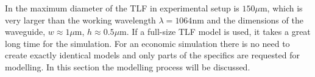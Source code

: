 In \cite{nanoscal_tapered_fiber} the maximum diameter of the TLF in experimental setup is $150\mu$m, which is very larger than the working wavelength $\lambda=1064$nm and the dimensions of the waveguide, $w\approx 1\mu$m, $h\approx 0.5\mu$m. If a full-size TLF model is used, it takes a great long time for the simulation. For an economic simulation there is no need to create exactly identical models and only parts of the specifics are requested for modelling. In this section the modelling process will be discussed. 